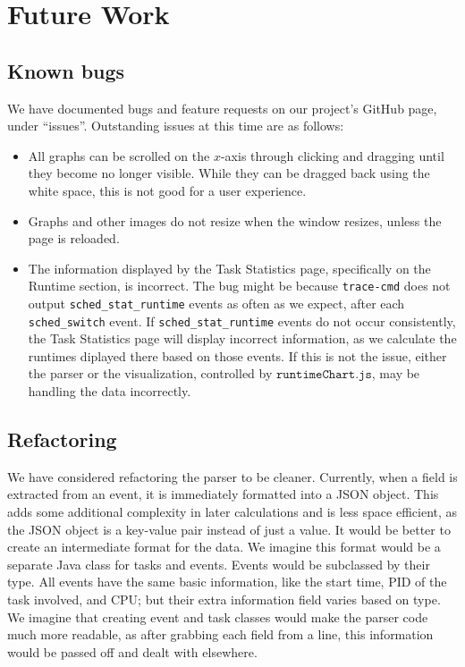 \documentclass{hmcclinic}
\begin{document}
\chapter{Future Work}
\section{Known bugs}

  We have documented bugs and feature requests on our project's GitHub page, under ``issues''. Outstanding issues at this time are as
  follows:

  \begin{itemize}
  
  \item All graphs can be scrolled on the $x$-axis through clicking and dragging until they become no longer visible. While
    they can be dragged back using the white space, this is not good for a user
    experience.

  \item Graphs and other images do not resize when the window resizes, unless the
    page is reloaded.

  \item The information displayed by the Task Statistics page, specifically on
    the Runtime section, is incorrect. The bug might be because
    \texttt{trace-cmd} does not output \texttt{sched\_stat\_runtime} events as
    often as we expect,  after each \texttt{sched\_switch} event. If
    \texttt{sched\_stat\_runtime} events do not occur consistently, the Task
    Statistics page will display incorrect information, as we calculate the runtimes diplayed there based on those events. If this is not the
    issue, either the parser or the visualization, controlled by
    $\texttt{runtimeChart.js}$,  may be handling the data
    incorrectly.

\end{itemize}


  \section{Refactoring}

  We have considered refactoring the parser to be cleaner. Currently, when a
  field is extracted from an event, it is immediately formatted into a JSON
  object.  This adds some additional complexity in later calculations and is
  less space efficient, as the JSON object is a key-value pair instead of just a value.
It would be better to create an intermediate format for the
  data. We imagine this format would be a separate Java class for tasks and
  events. Events would be subclassed by their type. All events have the same
  basic information, like the start time, PID of the task involved, and CPU; but
  their extra information field varies based on type. We imagine that creating
  event and task classes would make the parser code much more readable, as after
  grabbing each field from a line, this information would be passed off and
  dealt with elsewhere. 
\end{document}
